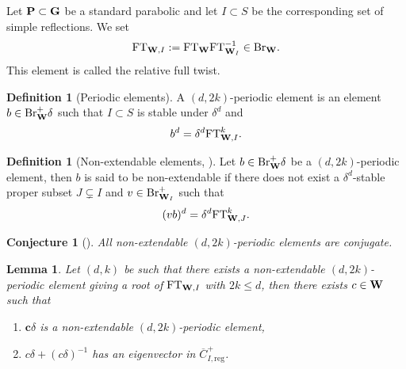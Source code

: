 \documentclass[article, 10pt, oneside, reqno]{amsart}
\theoremstyle{plain}
\newtheorem{lem}[thm]{Lemma}
\newtheorem{conj}[thm]{Conjecture}
\theoremstyle{definition}
\newtheorem{defi}[thm]{Definition}
\theoremstyle{remark}
\newcommand{\FT}{\mathrm{FT}}
\newcommand{\reg}{\mathrm{reg}}
\newcommand{\cbf}{\mathbf{c}}
\begin{document}
Let $\mathbf{P} \subset \mathbf{G}$ be a standard parabolic and let $I \subset S$ be the corresponding set of simple reflections. We set 
$$\FT_{\Wbf, I}  := \FT_{\Wbf} \FT_{\Wbf_{I}}^{-1} \in \Br_{\Wbf}.$$
This element is called the relative full twist. 

\begin{defi}[Periodic elements]\label{defi:periodic-elements}
A $(d,2k)$-periodic element is an element $b \in \mathrm{Br}_{\mathbf{W}}^+\delta$ such that $I \subset S$ is stable under $\delta^d$ and
$$b^d = \delta^d\FT_{\Wbf,I}^k.$$
\end{defi} 

\begin{defi}[Non-extendable elements, \cite{DigneMichelParabolic}]
Let $b \in \mathrm{Br}_{\mathbf{W}}^+\delta$ be a $(d,2k)$-periodic element, then $b$ is said to be non-extendable if there does not exist a $\delta^d$-stable proper subset $J \subsetneq I$ and $v \in \mathrm{Br}^+_{\mathbf{W}_{I}}$ such that 
$$(vb)^d = \delta^d\FT_{\Wbf, J}^k.$$
\end{defi} 

\begin{conj}[]\label{conj:non-extendable-elements-are-conjugate}
All non-extendable $(d,2k)$-periodic elements are conjugate.
\end{conj}

\begin{lem}\label{lem:existence-periodic-element}
Let $(d,k)$ be such that there exists a non-extendable $(d,2k)$-periodic element giving a root of $\FT_{\Wbf,I}$ with $2k\leq d$, then there exists $c \in \mathbf{W}$ such that 
\begin{enumerate}
\item $\cbf\delta$ is a non-extendable $(d,2k)$-periodic element, 
\item $c\delta + (c\delta)^{-1}$ has an eigenvector in $\overline{C}^+_{I, \reg}$.
\end{enumerate}
\end{lem}
\end{document}
